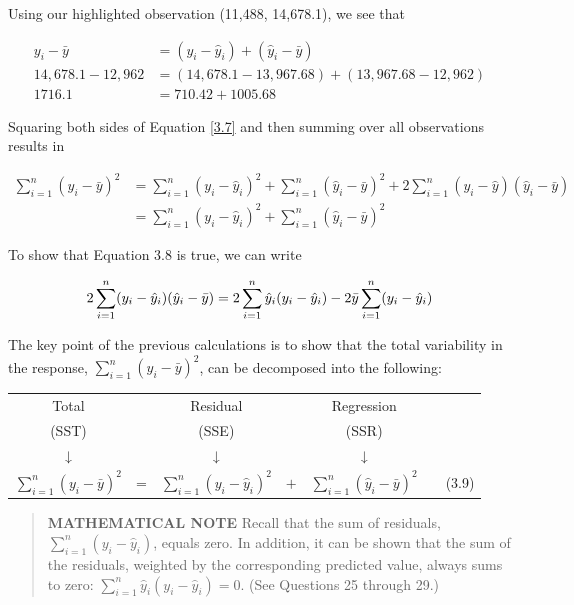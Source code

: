 \documentclass[
]{book}
\begin{document}
Using our highlighted observation (11,488, 14,678.1), we see that

\begin{align*}
y_i - \bar{y} &= (y_i - \hat{y}_i) + (\hat{y}_i - \bar{y}) \\
14{,}678.1 - 12{,}962 &= (14{,}678.1 - 13{,}967.68) + (13{,}967.68 - 12{,}962) \\
1716.1 &= 710.42 + 1005.68
\end{align*}

Squaring both sides of Equation \ref{3.7} and then summing over all observations results in

\begin{equation}
\begin{split}
\sum_{i=1}^n (y_i - \bar{y})^2 
  & = \sum_{i=1}^n (y_i - \hat{y}_i)^2 + \sum_{i=1}^n (\hat{y}_i - \bar{y})^2
  + 2 \sum_{i=1}^n (y_i -\hat{y})(\hat{y}_i - \bar{y}) \\ 
  & = \sum_{i=1}^n (y_i - \hat{y}_i)^2 + \sum_{i=1}^n (\hat{y}_i - \bar{y})^2  
\end{split}
\tag{3.8}
\end{equation}

To show that Equation 3.8 is true, we can write

\begin{equation}
2 \sum_{i=1}^n (y_i - \hat{y}_i)(\hat{y}_i - \bar{y})
  = 2 \sum_{i=1}^n \hat{y}_i (y_i - \hat{y}_i)  - 2 \bar{y} \sum_{i=1}^n (y_i - \hat{y}_i)
\notag  
\end{equation}

The key point of the previous calculations is to show that the total variability in the response, \(\sum_{i=1}^n (y_i - \bar{y})^2\), can be decomposed into the following:

\begin{table}
\centering
\begin{tabular}{>{}c>{}c>{}c>{}c>{}c>{}c>{}c}
\toprule
Total &  & Residual &  & Regression &  & \\
(SST) &  & (SSE) &  & (SSR) &  & \\
↓ &  & ↓ &  & ↓ &  & \\
$\sum_{i=1}^n (y_i - \bar{y})^2$ & = & $\sum_{i=1}^n (y_i - \hat{y}_i)^2$ & $+$ & $\sum_{i=1}^n (\hat{y}_i - \bar{y})^2$ &  & (3.9)\\
\bottomrule
\end{tabular}
\end{table}

\begin{quote}
\textbf{MATHEMATICAL NOTE} Recall that the sum of residuals, \(\sum_{i=1}^n (y_i - \hat{y}_i)\), equals zero. In addition, it can be shown that the sum of the residuals, weighted by the corresponding predicted value, always sums to zero: \(\sum_{i=1}^n \hat{y}_i (y_i - \hat{y}_i) = 0.\) (See Questions 25 through 29.)
\end{quote}
\end{document}
